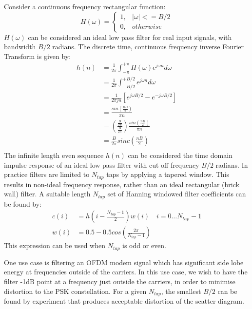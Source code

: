 \documentclass{article}
\begin{document}
Consider a continuous frequency rectangular function:
\begin{equation} \label{eq:h_omega}
H(\omega)= 
	\begin{cases}
      1, & |\omega| <= B/2 \\
      0, & otherwise
	\end{cases}
\end{equation}
$H(\omega)$ can be considered an ideal low pass filter for real input signals, with bandwidth $B/2$ radians. The discrete time, continuous frequency inverse Fourier Transform is given by:
\begin{equation} \label{eq:dtcf_1}
\begin{split}
h(n) &= \frac{1}{2 \pi} \int_{-\pi}^{+\pi} H(\omega )e^{j \omega n} d\omega \\
     &= \frac{1}{2 \pi} \int_{-B/2}^{+B/2} e^{j \omega n} d\omega \\
     &= \frac{1}{2 \pi jn} \left[ e^{j \omega B/2} - e^{-j \omega B/2} \right] \\
     &= \frac{sin \left( \frac{nB}{2} \right) }{\pi n} \\
     &= \left( \frac{\frac{B}{2 \pi}}{\frac{B}{2 \pi}} \right ) \frac{sin \left( \frac{nB}{2} \right) }{\pi n} \\
     &= \frac{B}{2 \pi} sinc \left( \frac{nB}{2} \right) \\
\end{split}
\end{equation}
The infinite length even sequence $h(n)$ can be considered the time domain impulse response of an ideal low pass filter with cut off frequency $B/2$ radians. In practice filters are limited to $N_{tap}$ taps by applying a tapered window.  This results in non-ideal frequency response, rather than an ideal rectangular (brick wall) filter. A suitable length $N_{tap}$ set of Hanning windowed filter coefficients can be found by:
\begin{equation}
\begin{split}
c(i) &= h \left( i-\frac{N_{tap}-1}{2} \right) w(i) \quad i=0 \ldots N_{tap}-1 \\
w(i) &= 0.5 - 0.5cos \left( \frac{2 \pi}{N_{tap}-1} \right)
\end{split}
\end{equation}
This expression can be used when $N_{tap}$ is odd or even.

One use case is filtering an OFDM modem signal which has significant side lobe energy at frequencies outside of the carriers. In this use case, we wish to have the filter -1dB point at a frequency just outside the carriers, in order to minimise distortion to the PSK constellation.  For a given $N_{tap}$, the smallest $B/2$ can be found by experiment that produces acceptable distortion of the scatter diagram.
\end{document}

